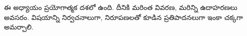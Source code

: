 \documentclass[../../../include/open-logic-chapter]{subfiles}
\begin{document}

\begin{editorial}
  ఈ అధ్యాయం ప్రయోగాత్మక దశలో ఉంది. దీనికి మరింత వివరణ,
  మరిన్ని ఉదాహరణలు అవసరం. విషయాన్ని నిర్వచనాలుగా,
  నిరూపణలతో కూడిన ప్రతిపాదనలుగా ఇంకా చక్కగా అమర్చాలి.
\end{editorial}


\OLEndChapterHook
\end{document}
